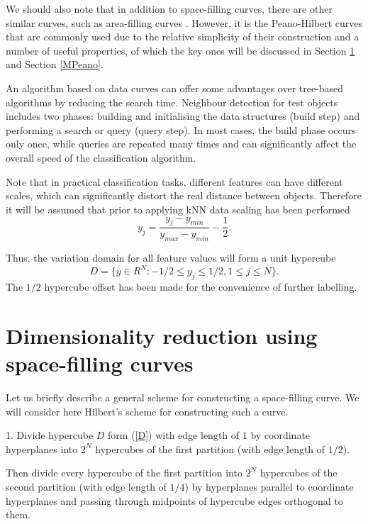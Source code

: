 \documentclass[entropy,article,submit,moreauthors,pdftex]{Definitions/mdpi}
\begin{document}
\textcolor[rgb]{1,0,0}{We should also note that in addition to space-filling curves, there are other similar curves, such as area-filling curves \cite{Nasso2022}. However, it is the Peano-Hilbert curves that are commonly used due to the relative simplicity of their construction and a number of useful properties, of which the key ones will be discussed in Section \ref{Peano} and Section \ref{MPeano}.}


An algorithm based on data curves can offer some advantages over tree-based algorithms by reducing the search time. Neighbour detection for test objects includes two phases: building and initialising the data structures (build step) and performing a search or query (query step). In most cases, the build phase occurs only once, while queries are repeated many times and can significantly affect the overall speed of the classification algorithm. 

Note that in practical classification tasks, different features can have different scales, which can significantly distort the real distance between objects. Therefore it will be assumed that prior to applying kNN data scaling has been performed 
\begin{equation}
y_j = \frac{y_j - y_{min}} {y_{max} - y_{min}} - \frac{1} {2}.
\end{equation} 

Thus, the variation domain for all feature values will form a unit hypercube
\begin{equation}\label{D}
D = \{ y \in R^N: -1/2 \leq y_j \leq 1/2,  1 \leq j \leq N \}.
\end{equation} 
The $1/2$ hypercube offset  has been made for the convenience of further labelling.

\section{Dimensionality reduction using space-filling curves}\label{Peano}

Let us briefly describe a general scheme for constructing a space-filling curve. We will consider here Hilbert's scheme for constructing such a curve.

1. Divide hypercube $D$ form (\ref{D}) with edge length of $1$ by coordinate hyperplanes into $2^N$ hypercubes of the first partition (with edge length of $1/2$).

Then divide every hypercube of the first partition into $2^N$  hypercubes of the second partition (with edge length of $1/4$) by hyperplanes parallel to coordinate hyperplanes and passing through midpoints of hypercube edges orthogonal to them.
\end{document}
